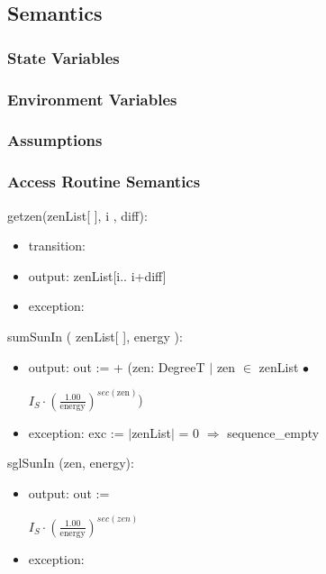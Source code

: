 \documentclass[12pt, titlepage]{article}
\begin{document}
\subsection{Semantics}

\subsubsection{State Variables}


\subsubsection{Environment Variables}


\subsubsection{Assumptions}


\subsubsection{Access Routine Semantics}

\noindent getzen(zenList[ ], i , diff):
\begin{itemize}
\item transition: 
\item output: zenList[i.. i+diff]
\item exception: 
\end{itemize}

\noindent sumSunIn (  zenList[ ], energy ):
\begin{itemize}
\item output: out := + (zen: DegreeT $|$ zen $\in$ zenList $\bullet$ 
\begin{center}\large
$I_{S} \cdot (\frac{1.00}{\text{energy}})^{sec(\text{zen})} $)
\end{center}
\item exception: exc := $|$zenList$|$ = 0 $\Rightarrow$ sequence\_empty
\end{itemize}

\noindent sglSunIn (zen, energy):
\begin{itemize}
\item output: out := 
\begin{center}\large
$I_{S} \cdot (\frac{1.00}{\text{energy}})^{sec(zen)} $
\end{center}
\item exception: 
\end{itemize}
\end{document}
